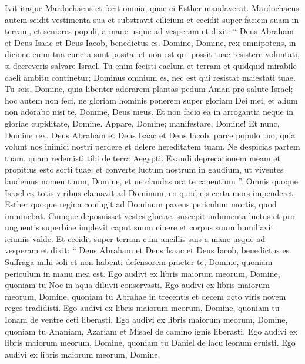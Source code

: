 \begin{biblechapter}
\begin{biblechapter}
\begin{biblechapter}
\begin{biblechapter}
\verse Ivit itaque Mardochaeus et fecit omnia, quae ei Esther mandaverat.
 \versea Mardochaeus autem scidit vestimenta sua et substravit cilicium et cecidit super faciem suam in terram, et seniores populi, a mane usque ad vesperam 
 \verseb et dixit:
 “ Deus Abraham et Deus Isaac et Deus Iacob, benedictus es.
 \versec Domine, Domine, rex omnipotens,
 in dicione enim tua cuncta sunt posita,
 et non est qui possit tuae resistere voluntati,
 si decreveris salvare Israel.
 \versed Tu enim fecisti caelum et terram
 et quidquid mirabile caeli ambitu continetur;
 \versee Dominus omnium es,
 nec est qui resistat maiestati tuae.
 \versef Tu scis, Domine, quia libenter adorarem
 plantas pedum Aman pro salute Israel;
 \verseg hoc autem non feci,
 ne gloriam hominis ponerem super gloriam Dei mei,
 et alium non adorabo nisi te, Domine, Deus meus.
 \verseh Et non facio ea in arrogantia
 neque in gloriae cupiditate, Domine.
 Appare, Domine; manifestare, Domine!
 \versei Et nunc, Domine rex, Deus Abraham et Deus Isaac et Deus Iacob,
 parce populo tuo,
 quia volunt nos inimici nostri perdere
 et delere hereditatem tuam.
 \versek Ne despicias partem tuam,
 quam redemisti tibi de terra Aegypti.
 \versel Exaudi deprecationem meam
 et propitius esto sorti tuae;
 et converte luctum nostrum in gaudium,
 ut viventes laudemus nomen tuum, Domine,
 et ne claudas ora te canentium ”.
 \versem Omnis quoque Israel ex totis viribus clamavit ad Dominum, eo quod eis certa mors impenderet.
 \versen Esther quoque regina confugit ad Dominum pavens periculum mortis, quod imminebat. 
\verseo Cumque deposuisset vestes gloriae, suscepit indumenta luctus et pro unguentis superbiae implevit caput suum cinere et corpus suum humiliavit ieiuniis valde. 
\versep Et cecidit super terram cum ancillis suis a mane usque ad vesperam et dixit:
 \verseq “ Deus Abraham et Deus Isaac et Deus Iacob, benedictus es.
 Suffraga mihi soli
 et non habenti defensorem praeter te, Domine,
 \verser quoniam periculum in manu mea est.
 \verses Ego audivi ex libris maiorum meorum, Domine,
 quoniam tu Noe in aqua diluvii conservasti.
 \verset Ego audivi ex libris maiorum meorum, Domine,
 quoniam tu Abrahae in trecentis et decem octo viris
 novem reges tradidisti.
 \verseu Ego audivi ex libris maiorum meorum, Domine,
 quoniam tu Ionam de ventre ceti liberasti.
 \versev Ego audivi ex libris maiorum meorum, Domine,
 quoniam tu Ananiam, Azariam et Misael de camino ignis liberasti.
 \versex Ego audivi ex libris maiorum meorum, Domine,
 quoniam tu Daniel de lacu leonum eruisti.
 \versey Ego audivi ex libris maiorum meorum, Domine,

\end{biblechapter}
\end{biblechapter}
\end{biblechapter}
\end{biblechapter}
